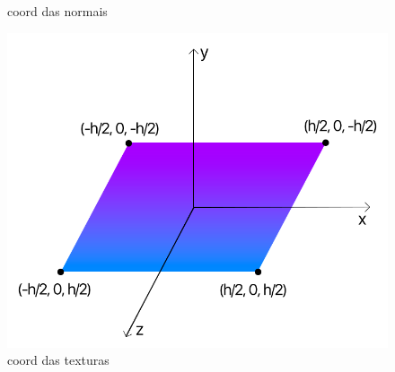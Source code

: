 \documentclass[a4paper]{report}
\begin{document}
\begin{figure}[H]
\begin{minipage}{0.33\textwidth}
        \caption{coord das normais}
    \end{minipage}\hfill
    \begin{minipage}{0.33\textwidth}
        \centering
        \includegraphics[width=\textwidth]{images/esquema_plano.png}
        \caption{coord das texturas}
    \end{minipage}\hfill
\end{figure}
\end{document}

